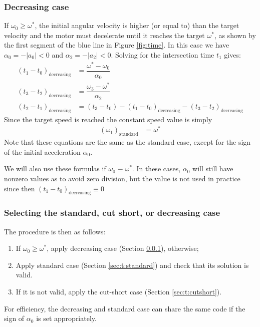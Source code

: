 \documentclass[12pt, a4paper]
{article}
\providecommand{\lr}[1]{\left(#1\right)}
\providecommand{\sub}[1]{_{\text{#1}}}
\providecommand{\w}{\omega}
\providecommand{\wt}{\w^*}
\renewcommand{\a}{\alpha}
\providecommand{\abs}[1]{\left|#1\right|}
\begin{document}
\subsubsection{Decreasing case}
\label{sec:t:decreasing}
If $\w_0 \geq \wt$, the initial angular velocity is higher (or equal to) than
the target velocity and the motor must decelerate until it reaches the target
$\wt$, as shown by the first segment of the blue line in Figure \ref{fig:time}.
In this case we have $\a_0 = -\abs{a_0} < 0$ and $\a_2 = -\abs{a_2} < 0$.
Solving for the intersection time $t_1$ gives:
%
\begin{align}
    \label{eq:t:t1mt0:decreasing}
    \lr{t_1 - t_0}\sub{decreasing} &= \dfrac{\wt-\w_0}{\a_0}\\[1em]
    \label{eq:t:t3mt2:decreasing}
    \lr{t_3 - t_2}\sub{decreasing} &= \dfrac{\w_3-\wt}{\a_2}\\[1em]
    \label{eq:t:t2mt1:decreasing}
    \lr{t_2 - t_1}\sub{decreasing} &=
        (t_3 - t_0) - \lr{t_1 - t_0}\sub{decreasing} -
        \lr{t_3 - t_2}\sub{decreasing}
\end{align}
%
Since the target speed is reached the constant speed value is simply
\begin{align}
    \lr{\w_1}\sub{standard} &= \wt
\end{align}
%
Note that these equations are the same as the standard case, except for the
sign of the initial acceleration $\a_0$.

We will also use these formulas if $\w_0 \equiv \wt$. In these cases, $\a_0$
will still have nonzero values as to avoid zero division, but the value is not
used in practice since then $\lr{t_1 - t_0}\sub{decreasing}\equiv0$

\subsubsection{Selecting the standard, cut short, or decreasing case}
\label{sec:t:selectionprocedure}
The procedure is then as follows:
% 
\begin{enumerate}
    \item If $\w_0 \geq \wt$, apply decreasing case (Section
    \ref{sec:t:decreasing}), otherwise;
    \item Apply standard case (Section \ref{sec:t:standard}) and check that its
          solution is valid.
    \item If it is not valid, apply the cut-short
          case (Section \ref{sec:t:cutshort}).
    
\end{enumerate}
%
For efficiency, the decreasing and standard case can share the same code if the
sign of $\a_0$ is set appropriately.
\end{document}

